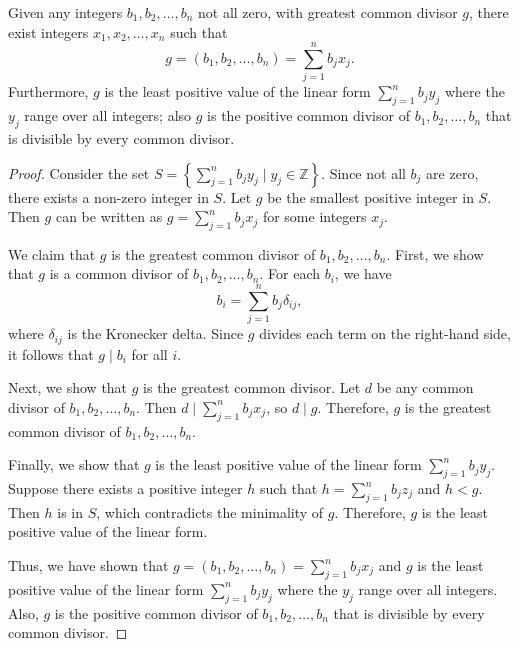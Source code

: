 \documentclass[11pt]{article}
\begin{document}
\begin{theorem}\label{1.5}
    Given any integers $b_1, b_2, \ldots, b_n$ not all zero, with greatest common divisor $g$, there exist integers $x_1, x_2, \ldots, x_n$ such that
    \[
        g = (b_1, b_2, \ldots, b_n) = \sum_{j=1}^{n} b_j x_j.
    \]
    Furthermore, $g$ is the least positive value of the linear form $\sum_{j=1}^{n}
        b_j y_j$ where the $y_j$ range over all integers; also $g$ is the positive
    common divisor of $b_1, b_2, \ldots, b_n$ that is divisible by every common
    divisor.
\end{theorem}
\begin{proof}
    Consider the set \( S = \left\{ \sum_{j=1}^{n} b_j y_j \mid y_j \in \mathbb{Z} \right\} \). Since not all \( b_j \) are zero, there exists a non-zero integer in \( S \). Let \( g \) be the smallest positive integer in \( S \). Then \( g \) can be written as \( g = \sum_{j=1}^{n} b_j x_j \) for some integers \( x_j \).

    We claim that \( g \) is the greatest common divisor of \( b_1, b_2, \ldots,
    b_n \). First, we show that \( g \) is a common divisor of \( b_1, b_2, \ldots,
    b_n \). For each \( b_i \), we have
    \[
        b_i = \sum_{j=1}^{n} b_j \delta_{ij},
    \]
    where \( \delta_{ij} \) is the Kronecker delta. Since \( g \) divides each term
    on the right-hand side, it follows that \( g \mid b_i \) for all \( i \).

    Next, we show that \( g \) is the greatest common divisor. Let \( d \) be any
    common divisor of \( b_1, b_2, \ldots, b_n \). Then \( d \mid \sum_{j=1}^{n}
    b_j x_j \), so \( d \mid g \). Therefore, \( g \) is the greatest common
    divisor of \( b_1, b_2, \ldots, b_n \).

    Finally, we show that \( g \) is the least positive value of the linear form \(
    \sum_{j=1}^{n} b_j y_j \). Suppose there exists a positive integer \( h \) such
    that \( h = \sum_{j=1}^{n} b_j z_j \) and \( h < g \). Then \( h \) is in \( S
    \), which contradicts the minimality of \( g \). Therefore, \( g \) is the
    least positive value of the linear form.

    Thus, we have shown that \( g = (b_1, b_2, \ldots, b_n) = \sum_{j=1}^{n} b_j
    x_j \) and \( g \) is the least positive value of the linear form \(
    \sum_{j=1}^{n} b_j y_j \) where the \( y_j \) range over all integers. Also, \(
    g \) is the positive common divisor of \( b_1, b_2, \ldots, b_n \) that is
    divisible by every common divisor.
\end{proof}
\end{document}
